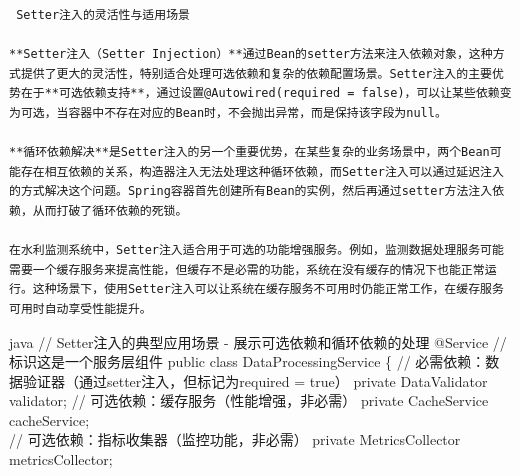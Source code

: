 \begin{lstlisting}
 Setter注入的灵活性与适用场景

**Setter注入（Setter Injection）**通过Bean的setter方法来注入依赖对象，这种方式提供了更大的灵活性，特别适合处理可选依赖和复杂的依赖配置场景。Setter注入的主要优势在于**可选依赖支持**，通过设置@Autowired(required = false)，可以让某些依赖变为可选，当容器中不存在对应的Bean时，不会抛出异常，而是保持该字段为null。

**循环依赖解决**是Setter注入的另一个重要优势，在某些复杂的业务场景中，两个Bean可能存在相互依赖的关系，构造器注入无法处理这种循环依赖，而Setter注入可以通过延迟注入的方式解决这个问题。Spring容器首先创建所有Bean的实例，然后再通过setter方法注入依赖，从而打破了循环依赖的死锁。

在水利监测系统中，Setter注入适合用于可选的功能增强服务。例如，监测数据处理服务可能需要一个缓存服务来提高性能，但缓存不是必需的功能，系统在没有缓存的情况下也能正常运行。这种场景下，使用Setter注入可以让系统在缓存服务不可用时仍能正常工作，在缓存服务可用时自动享受性能提升。
\end{lstlisting}

java // Setter注入的典型应用场景 - 展示可选依赖和循环依赖的处理 @Service // 标识这是一个服务层组件 public class DataProcessingService \{ // 必需依赖：数据验证器（通过setter注入，但标记为required = true） private DataValidator validator; // 可选依赖：缓存服务（性能增强，非必需） private CacheService cacheService;\\
// 可选依赖：指标收集器（监控功能，非必需） private MetricsCollector metricsCollector;

